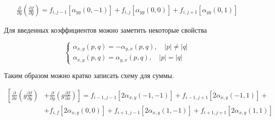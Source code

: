 \begin{equation*}
    \begin{split}
        \frac
            {\partial}
            {\partial y}
        \left(
            \frac
                {\partial f}
                {\partial y}
        \right)
        =
        f_{i, j-1}
        \left[
            \alpha_{yy} \left(0, -1\right)
        \right]
        +
        f_{i, j}
        \left[
            \alpha_{yy} \left(0, 0\right)
        \right]
        +
        f_{i, j+1}
        \left[
            \alpha_{yy} \left(0, 1\right)
        \right]
    \end{split}
\end{equation*}

Для введенных коэффициентов можно заметить некоторые свойства

\begin{equation*}
    \begin{cases}
        \alpha_{x,y} \left(p, q\right)
        =
        -
        \alpha_{y,x} \left(p,q\right),
            \quad
            \left|p\right|
            \ne
            \left|q\right|
        \\
        \alpha_{x,y} \left(p, q\right)
        =
        \alpha_{y,x} \left(p,q\right),
            \quad
            \left|p\right|
            =
            \left|q\right|
    \end{cases}
\end{equation*}

Таким образом можно кратко записать схему для суммы.

\begin{equation*}
    \begin{split}
        \left[
            \frac
                {\partial}
                {\partial x}
            \left(
                g
                \frac
                    {\partial f}
                    {\partial y}
            \right)
        \right.
            &
        \left.
            +
            \frac
                {\partial}
                {\partial y}
            \left(
                g
                \frac
                    {\partial f}
                    {\partial x}
            \right)
        \right]
        =
        f_{i-1, j-1}
        \left[
            2
            \alpha_{x,y} \left(-1, -1\right)
        \right]
        +
        f_{i-1, j+1}
        \left[
            2
            \alpha_{x,y} \left(-1, 1\right)
        \right]
        +
        \\
        &
        +
        f_{i,f}
        \left[
            2
            \alpha_{x,y} \left(0, 0\right)
        \right]
        +
        f_{i+1, j-1}
        \left[
            2
            \alpha_{x,y} \left(1, -1\right)
        \right]
        +
        f_{i+1, j+1}
        \left[
            2
            \alpha_{x,y} \left(1, 1\right)
        \right]
    \end{split}
\end{equation*}

